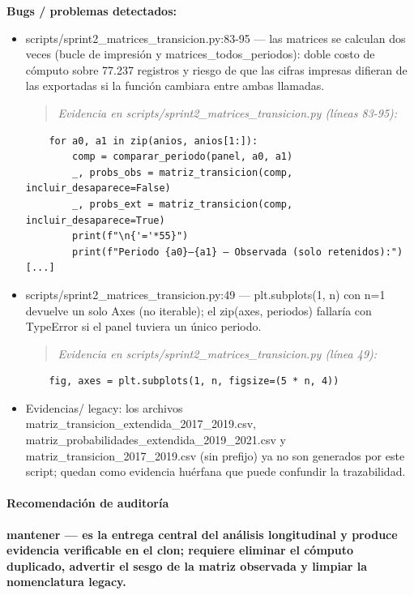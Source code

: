 \begin{tcolorbox}[riesgo]
\textbf{Bugs / problemas detectados:}
\begin{itemize}
  \item scripts/sprint2\_matrices\_transicion.py:83-95 --- las matrices se calculan dos veces (bucle de impresión y matrices\_todos\_periodos): doble costo de cómputo sobre 77.237 registros y riesgo de que las cifras impresas difieran de las exportadas si la función cambiara entre ambas llamadas.
\begin{quote}\footnotesize\ttfamily
\noindent\emph{Evidencia en scripts/sprint2\_matrices\_transicion.py (líneas 83-95):}
\end{quote}
\begin{lstlisting}
    for a0, a1 in zip(anios, anios[1:]):
        comp = comparar_periodo(panel, a0, a1)
        _, probs_obs = matriz_transicion(comp, incluir_desaparece=False)
        _, probs_ext = matriz_transicion(comp, incluir_desaparece=True)
        print(f"\n{'='*55}")
        print(f"Periodo {a0}–{a1} — Observada (solo retenidos):")
[...]
\end{lstlisting}

  \item scripts/sprint2\_matrices\_transicion.py:49 --- plt.subplots(1, n) con n=1 devuelve un solo Axes (no iterable); el zip(axes, periodos) fallaría con TypeError si el panel tuviera un único periodo.
\begin{quote}\footnotesize\ttfamily
\noindent\emph{Evidencia en scripts/sprint2\_matrices\_transicion.py (línea 49):}
\end{quote}
\begin{lstlisting}
    fig, axes = plt.subplots(1, n, figsize=(5 * n, 4))
\end{lstlisting}

  \item Evidencias/ legacy: los archivos matriz\_transicion\_extendida\_2017\_2019.csv, matriz\_probabilidades\_extendida\_2019\_2021.csv y matriz\_transicion\_2017\_2019.csv (sin prefijo) ya no son generados por este script; quedan como evidencia huérfana que puede confundir la trazabilidad.
\end{itemize}
\end{tcolorbox}

\paragraph{Recomendación de auditoría}
\textbf{mantener --- es la entrega central del análisis longitudinal y produce evidencia verificable en el clon; requiere eliminar el cómputo duplicado, advertir el sesgo de la matriz observada y limpiar la nomenclatura legacy.}

